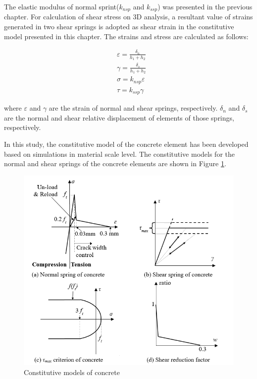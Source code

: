 The elastic modulus of normal sprint($k_{nsp}$ and $k_{ssp}$) was presented in the previous chapter. For calculation of shear stress on 3D analysis, a resultant value of strains generated in two shear springs is adopted as shear strain in the constitutive model presented in this chapter. The strains and stress are calculated as follows:

\begin{equation}
  \begin{aligned}
  &\varepsilon = \frac{\delta_n}{h_1 + h_2}\\
  &\gamma = \frac{\delta_s}{h_1 + h_2}\\
  &\sigma = k_{nsp}\varepsilon\\
  &\tau = k_{ssp}\gamma
  \end{aligned}
\end{equation}

where $\varepsilon$ and $\gamma$ are the strain of normal and shear springs, respectively. $\delta_n$ and $\delta_s$ are the normal and shear relative displacement of elements of those springs, respectively.

In this study, the constitutive model of the concrete element has been developed based on simulations in material scale level. The constitutive models for the normal and shear springs of the concrete elements are shown in Figure \ref{fig:constitutive_model}.

\begin{figure}[ht!]
\centering
\includegraphics[width=.9\linewidth]{Files/Background/graph.png}
  \caption{Constitutive models of concrete}
  \label{fig:constitutive_model}
\end{figure}

